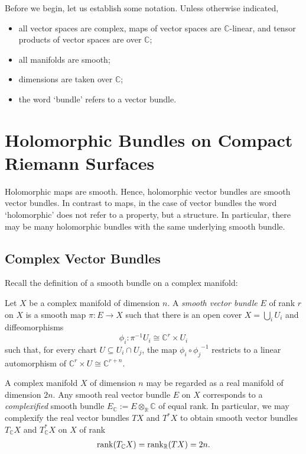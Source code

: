 \documentclass[12pt]{ociamthesis}  %
\begin{document}
Before we begin, let us establish some notation. Unless otherwise
indicated,

\begin{itemize}
  \item all vector spaces are complex, maps of vector spaces are
        $\mathbb{C}$-linear, and tensor products of vector spaces are
        over $\mathbb{C}$;
  \item all manifolds are smooth;
  \item dimensions are taken over $\mathbb{C}$;
  \item the word `bundle' refers to a vector bundle.
\end{itemize}

\section{Holomorphic Bundles on Compact Riemann Surfaces}

Holomorphic maps are smooth. Hence, holomorphic vector bundles
are smooth vector bundles. In contrast to maps, in the case of vector
bundles the word `holomorphic' does not refer to a property, but
a structure. In particular, there may be many holomorphic bundles with
the same underlying smooth bundle.

\subsection{Complex Vector Bundles}

Recall the definition of a smooth bundle on a complex
manifold:

\begin{definition}\label{def:complex_bundle}
  Let $X$ be a complex manifold of dimension $n$. A
  \emph{smooth vector bundle} $E$ of rank $r$ on $X$ is a smooth map
  $\pi : E\to X$ such that there
  is an open cover $X = \bigcup_i U_i$ and diffeomorphisms
  \begin{equation}\label{eq:smooth_trivialisation}
    \phi_i : {\pi}^{-1}U_i \cong \mathbb{C}^r \times U_i
  \end{equation}
  such that, for every chart $U\subseteq U_i\cap U_j$, the
  map $\phi_i \circ {\phi_j}^{-1}$ restricts to a linear
  automorphism of $\mathbb{C}^r\times U \cong \mathbb{C}^{r+n}$.
\end{definition}

\begin{example}
  A complex manifold $X$ of dimension $n$ may be regarded as a
  real manifold of dimension $2n$. Any smooth real vector bundle
  $E$ on $X$ corresponds to a \emph{complexified} smooth bundle
  $E_{\mathbb{C}} := E\otimes_{\mathbb{R}} \mathbb{C}$ of equal rank.
  In particular, we may complexify the real vector bundles
  $TX$ and $T^*X$ to obtain smooth vector bundles
  $T_{\mathbb{C}} X$ and $T_{\mathbb{C}}^*X$
  on $X$ of rank
  \begin{align*}
    \operatorname{rank}(T_\mathbb{C} X)
    = \operatorname{rank}_{\mathbb{R}} (TX) = 2n.
  \end{align*}
\end{example}
\end{document}

